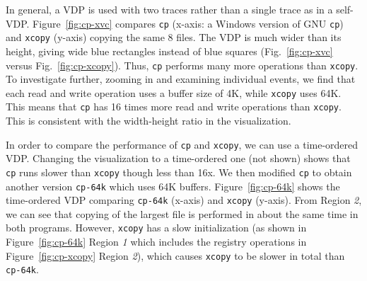 In general, a VDP is used with two traces rather than a single
trace as in a self-VDP.
Figure~\ref{fig:cp-xvc} compares {\tt cp} (x-axis: a Windows version
of GNU {\tt cp}) and {\tt xcopy} (y-axis) copying the same 8 files.
The VDP is much wider than its height, giving
wide blue rectangles instead of blue squares 
(Fig.~\ref{fig:cp-xvc} versus Fig.~\ref{fig:cp-xcopy}).
Thus, {\tt cp} performs many more operations than {\tt xcopy}.
To investigate further, zooming in and examining individual events, 
we find that each read and write operation uses a buffer size of 4K,
while {\tt xcopy} uses 64K.
This means that {\tt cp} has 16 times more read and write operations
than {\tt xcopy}.
This is consistent with the width-height ratio in the visualization.


In order to compare the performance of {\tt cp} and {\tt xcopy},
we can use a time-ordered VDP.
Changing the visualization to a time-ordered one (not shown)
shows that {\tt cp} runs slower than {\tt xcopy} though less than 16x.
We then modified {\tt cp} to obtain another version
{\tt cp-64k} which uses 64K buffers.
Figure~\ref{fig:cp-64k} shows the time-ordered VDP comparing
{\tt cp-64k} (x-axis) and {\tt xcopy} (y-axis).
From Region {\em 2}, we can see that copying of the largest file
is performed in about the same time in both programs.
However, {\tt xcopy} has a slow initialization 
(as shown in Figure~\ref{fig:cp-64k} Region {\em 1} which includes the registry
operations in Figure~\ref{fig:cp-xcopy} Region {\em 2}),
which causes {\tt xcopy} to be slower in total than {\tt cp-64k}.



